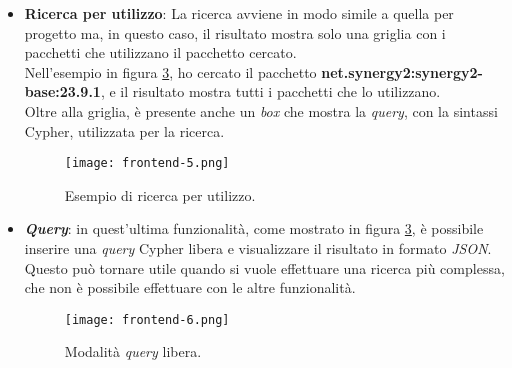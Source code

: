 \begin{itemize}
\begin{figure}[h]
\begin{minipage}{0.60\textwidth}
          \centering
          \texttt{[image: frontend-3.png]} 
          \caption{Risultato tabellare.}
          \label{fig:frontend-3}
      \end{minipage}\hfill
      \begin{minipage}{0.30\textwidth}
          \centering
          \texttt{[image: frontend-4.png]} 
          \caption{Risultato ad albero.}
          \label{fig:frontend-4}
      \end{minipage}
    \end{figure}
    Inoltre, è possibile fare un controllo sulla presenza di aggiornamenti e vulnerabilità, ad esempio, come mostrato in figura \ref*{fig:frontend-8},
    vengono mostrati tutti i pacchetti che hanno una versione più recente di quella utilizzata dal progetto.\\
    \begin{figure}[!h] 
      \centering
      \texttt{[image: frontend-88.png]} 
      \caption{Visualizzazione di tutti gli aggiornamenti disponibili.}
      \label{fig:frontend-8}
    \end{figure}  
  \item \textbf{Ricerca per utilizzo}: La ricerca avviene in modo simile a quella per progetto ma, in questo caso, il risultato mostra solo una 
  griglia con i pacchetti che utilizzano il pacchetto cercato.\\
  Nell'esempio in figura \ref*{fig:frontend-5}, ho cercato il pacchetto \textbf{net.synergy2:synergy2-base:23.9.1}, e il risultato mostra tutti i pacchetti che lo utilizzano.\\
  Oltre alla griglia, è presente anche un \textit{box} che mostra la \textit{query}, con la sintassi Cypher, utilizzata per la ricerca.\\


  \begin{figure}[!h] 
    \centering
    \texttt{[image: frontend-5.png]} 
    \caption{Esempio di ricerca per utilizzo.}
    \label{fig:frontend-5}
  \end{figure}  
  \item \textbf{\textit{Query}}: in quest'ultima funzionalità, come mostrato in figura \ref*{fig:frontend-5}, è possibile inserire una \textit{query} Cypher libera e visualizzare il risultato in 
  formato \textit{JSON}. Questo può tornare utile quando si vuole effettuare una ricerca più complessa, che non è possibile effettuare con le altre funzionalità.\\
  \begin{figure}[!h] 
    \centering
    \texttt{[image: frontend-6.png]} 
    \caption{Modalità \textit{query} libera.}
    \label{fig:frontend-6}
  \end{figure}  

\end{itemize}
